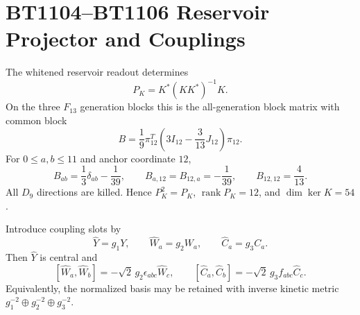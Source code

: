 \section{BT1104--BT1106 Reservoir Projector and Couplings}
\label{sec:bt1104-bt1106-projector-coupling-report}

The whitened reservoir readout determines
\[
P_K=K^*(KK^*)^{-1}K.
\]
On the three $F_{13}$ generation blocks this is the all-generation block matrix with common block
\[
B=\frac19\pi_{12}^T\left(3I_{12}-\frac3{13}J_{12}\right)\pi_{12}.
\]
For $0\le a,b\le 11$ and anchor coordinate $12$,
\[
B_{ab}=\frac13\delta_{ab}-\frac1{39},
\qquad
B_{a,12}=B_{12,a}=-\frac1{39},
\qquad
B_{12,12}=\frac4{13}.
\]
All $D_9$ directions are killed.  Hence $P_K^2=P_K$, $\operatorname{rank}P_K=12$, and $\dim\ker K=54$.

Introduce coupling slots by
\[
\widehat Y=g_1Y,
\qquad
\widehat W_a=g_2W_a,
\qquad
\widehat C_a=g_3C_a.
\]
Then $\widehat Y$ is central and
\[
[\widehat W_a,\widehat W_b]=-\sqrt2\,g_2\epsilon_{abc}\widehat W_c,
\qquad
[\widehat C_a,\widehat C_b]=-\sqrt2\,g_3f_{abc}\widehat C_c.
\]
Equivalently, the normalized basis may be retained with inverse kinetic metric $g_1^{-2}\oplus g_2^{-2}\oplus g_3^{-2}$.
